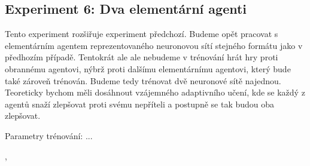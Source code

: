 \subsection{Experiment 6: Dva elementární agenti}
Tento experiment rozšiřuje experiment předchozí. Budeme opět pracovat s elementárním agentem reprezentovaného neuronovou sítí stejného formátu jako v předhozím případě.
Tentokrát ale ale nebudeme v trénování hrát hry proti obrannému agentovi, nýbrž proti dalšímu elementárnímu agentovi, který bude také zároveň trénován.
Budeme tedy trénovat dvě neuronové sítě najednou. Teoreticky bychom měli dosáhnout vzájemného adaptivního učení, kde se každý z agentů snaží zlepšovat proti svému nepříteli a postupně se tak budou oba zlepšovat.
\par
Parametry trénování: ... 




,